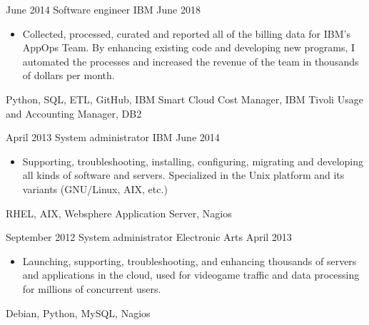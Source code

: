 \begin{experiences}
    \experience
        {June 2014}
        {Software engineer}
        {IBM}
        {June 2018}
        {
            \begin{itemize}
                \item Collected, processed, curated and reported all of the 
                    billing data for IBM's AppOps Team. By enhancing existing 
                    code and developing new programs, I automated the processes 
                    and increased the revenue of the team in thousands of 
                    dollars per month.
            \end{itemize}
        }
        {
            Python,
            SQL,
            ETL,
            GitHub,
            IBM Smart Cloud Cost Manager,
            IBM Tivoli Usage and Accounting Manager,
            DB2
        }

    \emptySeparator

    \experience
        {April 2013}
        {System administrator}
        {IBM}
        {June 2014}
        {
            \begin{itemize}
                \item Supporting, troubleshooting, installing, configuring, 
                    migrating and developing all kinds of software and servers. 
                    Specialized in the Unix platform and its variants 
                    (GNU/Linux, AIX, etc.)
            \end{itemize}
        }
        {
            RHEL,
            AIX,
            Websphere Application Server,
            Nagios
        }

    \emptySeparator

    \experience
        {September 2012}
        {System administrator}
        {Electronic Arts}
        {April 2013}
        {
            \begin{itemize}
                \item Launching, supporting, troubleshooting, and enhancing
                    thousands of servers and applications in the cloud, used 
                    for videogame traffic and data processing for millions of 
                    concurrent users.
            \end{itemize}
        }
        {
            Debian,
            Python,
            MySQL,
            Nagios
        }

    \emptySeparator


\end{experiences}

